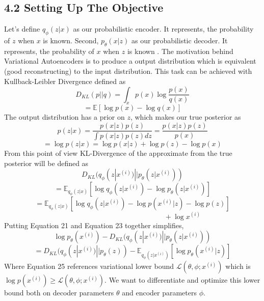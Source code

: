 \documentclass[11pt,twocolumn]{article}
\begin{document}
\subsection{4.2 Setting Up The Objective}
\hspace*{0.5cm}Let's define $q_\phi(z|x)$ as our probabilistic encoder. It represents, the probability of $z$ when $x$ is known. Second, $p_\theta(x|z)$ as our probabilistic decoder. It represents, the probability of $x$ when $z$ is known \cite{kingma2014autoencoding}. The motivation behind Variational Autoencoders is to produce a output distribution which is equivalent (good reconstructing) to the input distribution. This task can be achieved with Kullback-Leibler Divergence defined as 
\begin{equation} 
D_{KL}(p||q) = \int_x p(x) \log \frac{p(x)}{q(x)}
\end{equation} 
\begin{equation} 
= \mathbb{E}[\log p(x) - \log q(x)]
\end{equation} 
The output distribution has a prior on $z$, which makes our true posterior as 
\begin{equation} 
p(z|x) = \frac{p(x|z) p(z)}{\int p(x|z)p(z) dz} = \frac{p(x|z) p(z)}{p(x)}
\end{equation} 
\begin{equation}
= \log p(z|x) = \log p(x|z) + \log p(z) - \log p(x)
\end{equation} 
From this point of view KL-Divergence of the approximate from the true posterior will be defined as 
\begin{equation}
D_{KL}(q_\phi(z|x^{(i)}) || p_\theta(z|x^{(i)}))
\end{equation} 
\begin{equation}
= \mathbb{E}_{q_\phi(z|x)}[\log q_\phi(z|x^{(i)}) - \log p_\theta(z|x^{(i)})]
\end{equation} 
$$ = \mathbb{E}_{q_\phi(z|x)}[\log q_\phi(z|x^{(i)}) - \log p(x^{(i)}|z) - \log p(z)]$$
\begin{equation}
\qquad \qquad \qquad \qquad \qquad \qquad \qquad + \log x^{(i)}
\end{equation} 
Putting Equation 21 and Equation 23 together simplifies,
\begin{equation}
\log p_\theta(x^{(i)}) - D_{KL}(q_\phi(z|x^{(i)}) || p_\theta(z|x^{(i)}))
\end{equation} 
\begin{equation}
=D_{KL}(q_\phi(z|x^{(i)}) || p_\theta(z)) - \mathbb{E}_{q_\phi(z|x^{(i)})}[\log p_\theta (x^{(i)}|z)]
\end{equation} 
Where Equation 25 references variational lower bound $\mathcal{L}(\theta,\phi;x^{(i)})$ \cite{kingma2014autoencoding} \cite{cs228} which is $\log p(x^{(i)}) \geq \mathcal{L}(\theta,\phi;x^{(i)})$. We want to differentiate and optimize this lower bound both on decoder parameters $\theta$ and encoder parameters $\phi$.

\printbibliography[title=References]
\end{document}

